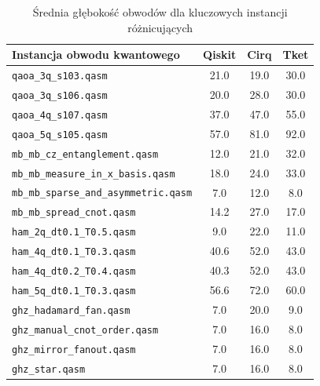 \begin{table}
    \centering
    \scriptsize
    \caption{Średnia głębokość obwodów dla kluczowych instancji różnicujących}
    \label{table:anomalies_depth}
        \begin{tabular}{l@{\hspace{8pt}}c@{\hspace{8pt}}c@{\hspace{8pt}}c}
        \toprule
        \textbf{Instancja obwodu kwantowego} & \textbf{Qiskit} & \textbf{Cirq} & \textbf{Tket} \\
        \midrule
        \texttt{qaoa\_3q\_s103.qasm} & {21.0} & {19.0} & {30.0} \\
        \texttt{qaoa\_3q\_s106.qasm} & {20.0} & {28.0} & {30.0} \\
        \texttt{qaoa\_4q\_s107.qasm} & {37.0} & {47.0} & {55.0} \\
        \texttt{qaoa\_5q\_s105.qasm} & {57.0} & {81.0} & {92.0} \\
        \texttt{mb\_mb\_cz\_entanglement.qasm} & {12.0} & {21.0} & {32.0} \\
        \texttt{mb\_mb\_measure\_in\_x\_basis.qasm} & {18.0} & {24.0} & {33.0} \\
        \texttt{mb\_mb\_sparse\_and\_asymmetric.qasm} & {7.0} & {12.0} & {8.0} \\
        \texttt{mb\_mb\_spread\_cnot.qasm} & {14.2} & {27.0} & {17.0} \\
        \texttt{ham\_2q\_dt0.1\_T0.5.qasm} & {9.0} & {22.0} & {11.0} \\
        \texttt{ham\_4q\_dt0.1\_T0.3.qasm} & {40.6} & {52.0} & {43.0} \\
        \texttt{ham\_4q\_dt0.2\_T0.4.qasm} & {40.3} & {52.0} & {43.0} \\
        \texttt{ham\_5q\_dt0.1\_T0.3.qasm} & {56.6} & {72.0} & {60.0} \\
        \texttt{ghz\_hadamard\_fan.qasm} & {7.0} & {20.0} & {9.0} \\
        \texttt{ghz\_manual\_cnot\_order.qasm} & {7.0} & {16.0} & {8.0} \\
        \texttt{ghz\_mirror\_fanout.qasm} & {7.0} & {16.0} & {8.0} \\
        \texttt{ghz\_star.qasm} & {7.0} & {16.0} & {8.0} \\
        \bottomrule
    \end{tabular}
\end{table}

